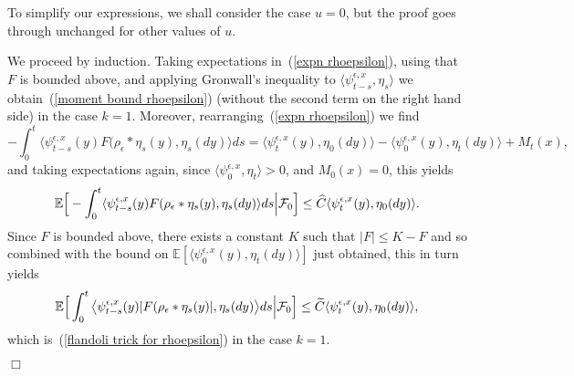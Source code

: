 \documentclass[12pt]{article}
\newenvironment {proof}{{\noindent\bf Proof }}{\hfill $\Box$ \medskip}
\newcommand{\IE}{\mathbb E}
\numberwithin{equation}{section}
\begin{document}
\begin{proof}
To simplify our expressions, we shall consider the case $u=0$, but
the proof goes through unchanged for other values of $u$.

We proceed by induction. 
Taking expectations in~(\ref{expn rhoepsilon}), using that $F$ is bounded above, and 
applying Gronwall's inequality to 
$\langle\psi^{\epsilon,x}_{t-s}, \eta_s\rangle$ 
we obtain~(\ref{moment bound rhoepsilon})
(without the second term on the right hand side) in the case $k=1$.
Moreover, rearranging~(\ref{expn rhoepsilon}) we find 
\begin{equation}
-\int_0^t\big\langle\psi^{\epsilon,x}_{t-s}(y)
F(\rho_\epsilon*\eta_s(y), \eta_s(dy)\big\rangle ds
=\langle\psi^{\epsilon,x}_t(y),\eta_0(dy)\rangle
-\langle \psi^{\epsilon,x}_0(y),\eta_t(dy)\rangle +M_t(x),
\end{equation} 
and taking expectations again, 
since $\langle\psi^{\epsilon,x}_0,\eta_t\rangle>0$, and $M_0(x)=0$,
this yields 
$$\IE\Big[-\int_0^t\langle\psi^{\epsilon,x}_{t-s}(y)F(\rho_\epsilon*\eta_s(y), 
\eta_s(dy)\rangle ds\Big|{\cal F}_0\Big]
\leq \widehat{C}\langle\psi^{\epsilon, x}_t(y),\eta_0(dy)\rangle.$$
Since $F$ is bounded above, there exists a constant $K$ such that $|F|\leq K-F$ and so 
combined with the bound on $\IE[\langle\psi^{\epsilon, x}_0(y),\eta_t(dy)\rangle]$ just
obtained, this in turn yields 
$$\IE\Big[\int_0^t\big\langle\psi^{\epsilon,x}_{t-s}(y)
|F(\rho_\epsilon*\eta_s(y)|, 
\eta_s(dy)\big\rangle ds\Big|{\cal F}_0\Big]\leq 
\widetilde{C}\langle\psi^{\epsilon, x}_t(y),\eta_0(dy)\rangle,$$
which is~(\ref{flandoli trick for rhoepsilon})
in the case $k=1$.


\end{proof}
\end{document}
